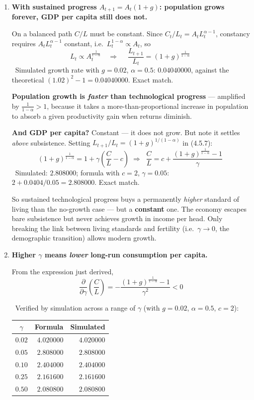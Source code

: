 \documentclass[12pt, letterpaper]{article}
\newcommand{\pd}[2]{\dfrac{\partial #1}{\partial #2}}
\begin{document}
\begin{tcolorbox}[oddbox,title={Problem 4.5 \quad A Malthusian Model}]
\begin{enumerate}
\item \textbf{With sustained progress $A_{t+1} = A_t(1+g)$: population grows forever, GDP per
capita still does not.}

On a balanced path $C/L$ must be constant. Since $C_t/L_t = A_t L_t^{\alpha-1}$, constancy
requires $A_t L_t^{\alpha-1}$ constant, i.e.\ $L_t^{1-\alpha} \propto A_t$, so
$$L_t \propto A_t^{\frac{1}{1-\alpha}}
\quad\Longrightarrow\quad
\boxed{\;\frac{L_{t+1}}{L_t} = (1+g)^{\frac{1}{1-\alpha}}\;}$$
\checkmark\ Simulated growth rate with $g = 0.02$, $\alpha = 0.5$: $0.04040000$, against the
theoretical $(1.02)^{2}-1 = 0.04040000$. Exact match.

\textbf{Population growth is \emph{faster} than technological progress} --- amplified by
$\frac{1}{1-\alpha} > 1$, because it takes a more-than-proportional increase in population to
absorb a given productivity gain when returns diminish.

\textbf{And GDP per capita?} Constant --- it does not grow. But note it settles \emph{above}
subsistence. Setting $L_{t+1}/L_t = (1+g)^{1/(1-\alpha)}$ in (4.5.7):
$$(1+g)^{\frac{1}{1-\alpha}} = 1 + \gamma\left(\frac{C}{L} - c\right)
\;\Longrightarrow\;
\boxed{\;\frac{C}{L} = c + \frac{(1+g)^{\frac{1}{1-\alpha}} - 1}{\gamma}\;}$$
\checkmark\ Simulated: $2.808000$; formula with $c=2$, $\gamma=0.05$: $2 + 0.0404/0.05
= 2.808000$. Exact match.

So sustained technological progress buys a permanently \emph{higher} standard of living than
the no-growth case --- but a \textbf{constant} one. The economy escapes bare subsistence but
never achieves growth in income per head. Only breaking the link between living standards and
fertility (i.e.\ $\gamma \to 0$, the demographic transition) allows modern growth.

\item \textbf{Higher $\gamma$ means \emph{lower} long-run consumption per capita.}

From the expression just derived,
$$\pd{}{\gamma}\left(\frac{C}{L}\right)
= -\frac{(1+g)^{\frac{1}{1-\alpha}} - 1}{\gamma^{2}} < 0$$

\checkmark\ Verified by simulation across a range of $\gamma$ (with $g=0.02$, $\alpha=0.5$,
$c=2$):

\begin{center}
\begin{tabular}{crr}
\toprule
$\gamma$ & \textbf{Formula} & \textbf{Simulated} \\
\midrule
$0.02$ & $4.020000$ & $4.020000$ \\
$0.05$ & $2.808000$ & $2.808000$ \\
$0.10$ & $2.404000$ & $2.404000$ \\
$0.25$ & $2.161600$ & $2.161600$ \\
$0.50$ & $2.080800$ & $2.080800$ \\
\bottomrule
\end{tabular}
\end{center}


\end{enumerate}
\end{tcolorbox}
\end{document}
